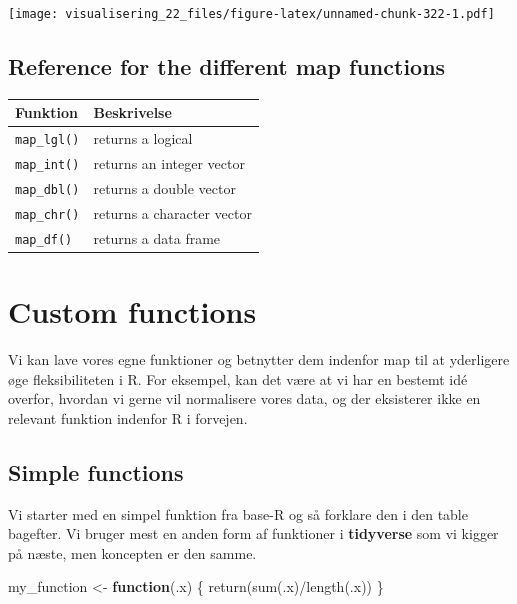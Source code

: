 \documentclass[
]{book}
\newenvironment{Shaded}{\begin{snugshade}}{\end{snugshade}}
\newcommand{\ControlFlowTok}[1]{\textcolor[rgb]{0.13,0.29,0.53}{\textbf{#1}}}
\newcommand{\FunctionTok}[1]{\textcolor[rgb]{0.00,0.00,0.00}{#1}}
\newcommand{\NormalTok}[1]{#1}
\newcommand{\OtherTok}[1]{\textcolor[rgb]{0.56,0.35,0.01}{#1}}
\newcommand{\SpecialCharTok}[1]{\textcolor[rgb]{0.00,0.00,0.00}{#1}}
\begin{document}
\texttt{[image: visualisering\_22\_files/figure-latex/unnamed-chunk-322-1.pdf]}

\hypertarget{reference-for-the-different-map-functions}{%
\subsection{Reference for the different map functions}\label{reference-for-the-different-map-functions}}

\begin{longtable}[]{@{}ll@{}}
\toprule
Funktion & Beskrivelse \\
\midrule
\endhead
\texttt{map\_lgl()} & returns a logical \\
\texttt{map\_int()} & returns an integer vector \\
\texttt{map\_dbl()} & returns a double vector \\
\texttt{map\_chr()} & returns a character vector \\
\texttt{map\_df()} & returns a data frame \\
\bottomrule
\end{longtable}

\hypertarget{custom-functions}{%
\section{Custom functions}\label{custom-functions}}

Vi kan lave vores egne funktioner og betnytter dem indenfor map til at yderligere øge fleksibiliteten i R. For eksempel, kan det være at vi har en bestemt idé overfor, hvordan vi gerne vil normalisere vores data, og der eksisterer ikke en relevant funktion indenfor R i forvejen.

\hypertarget{simple-functions}{%
\subsection{Simple functions}\label{simple-functions}}

Vi starter med en simpel funktion fra base-R og så forklare den i den table bagefter. Vi bruger mest en anden form af funktioner i \textbf{tidyverse} som vi kigger på næste, men koncepten er den samme.

\begin{Shaded}
\begin{Highlighting}[]
\NormalTok{my\_function }\OtherTok{\textless{}{-}} \ControlFlowTok{function}\NormalTok{(.x)}
\NormalTok{\{}
  \FunctionTok{return}\NormalTok{(}\FunctionTok{sum}\NormalTok{(.x)}\SpecialCharTok{/}\FunctionTok{length}\NormalTok{(.x))}
\NormalTok{\}}
\end{Highlighting}
\end{Shaded}
\end{document}
